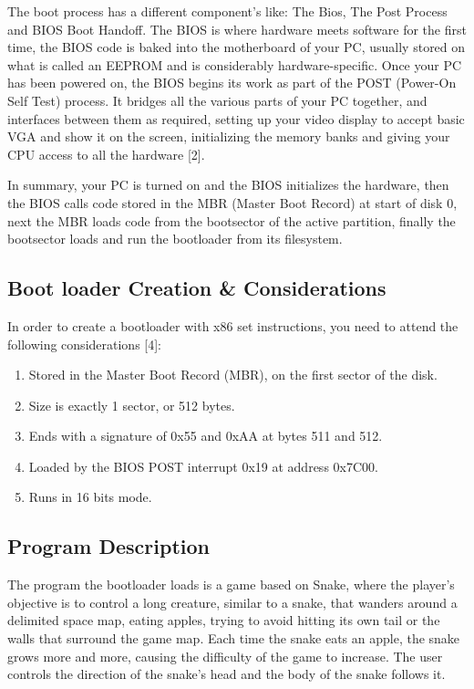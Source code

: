 \documentclass[11pt]{book}
\begin{document}
The boot process has a different component’s like: The Bios, The Post Process and BIOS Boot Handoff. The BIOS is where hardware meets software for the first time, the BIOS code is baked into the motherboard of your PC, usually stored on what is called an EEPROM and is considerably hardware-specific. Once your PC has been powered on, the BIOS begins its work as part of the
POST (Power-On Self Test) process. It bridges all the various parts of your PC together, and interfaces between them as required, setting up your video display
to accept basic VGA and show it on the screen, initializing the memory banks and giving your CPU access to all the hardware [2].

In summary, your PC is turned on and the BIOS initializes the hardware, then the BIOS calls code stored in the MBR (Master Boot Record) at start of
disk 0, next the MBR loads code from the bootsector of the active partition, finally the bootsector loads and run the bootloader from its filesystem.


\subsection*{Boot loader Creation \& Considerations}

In order to create a bootloader with x86 set instructions, you need to attend the following considerations [4]:
\begin{enumerate}
    \item {Stored in the Master Boot Record (MBR), on the first sector of the disk.}
    \item{Size is exactly 1 sector, or 512 bytes.}
    \item{Ends with a signature of 0x55 and 0xAA at bytes 511 and 512.}
    \item{Loaded by the BIOS POST interrupt 0x19 at address 0x7C00.}
    \item{Runs in 16 bits mode.}
\end{enumerate}

\subsection*{Program Description}

The program the bootloader loads is a game based on Snake, where the player’s objective is to control a long creature, similar to a snake, that wanders around a delimited space map, eating apples, trying to avoid hitting its own tail or the walls that surround the game map. Each time the snake eats an apple, the snake grows more and more, causing the difficulty of the game to increase. The user controls the direction of the snake's head and the body of the snake follows it. 
\end{document}
